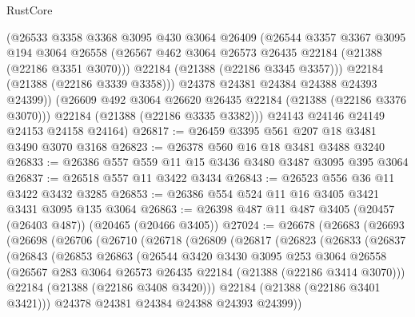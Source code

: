 \begin{lexlean}{RustCore}
\begin{coremodule}
            (@26533
              @3358
              @3368
              @3095
              @430
              @3064
              @26409
              (@26544
                @3357
                @3367
                @3095
                @194
                @3064
                @26558
                (@26567 @462 @3064 @26573 @26435 @22184 (@21388 (@22186 @3351 @3070)))
                @22184
                (@21388 (@22186 @3345 @3357)))
              @22184
              (@21388 (@22186 @3339 @3358)))
            @24378
            @24381
            @24384
            @24388
            @24393
            @24399))
        (@26609 @492 @3064 @26620 @26435 @22184 (@21388 (@22186 @3376 @3070)))
        @22184
        (@21388 (@22186 @3335 @3382)))
      @24143
      @24146
      @24149
      @24153
      @24158
      @24164)
@26817 := @26459 @3395 @561 @207 @18 @3481 @3490 @3070 @3168
@26823 := @26378 @560 @16 @18 @3481 @3488 @3240
@26833 := @26386 @557 @559 @11 @15 @3436 @3480 @3487 @3095 @395 @3064
@26837 := @26518 @557 @11 @3422 @3434
@26843 := @26523 @556 @36 @11 @3422 @3432 @3285
@26853 := @26386 @554 @524 @11 @16 @3405 @3421 @3431 @3095 @135 @3064
@26863 := @26398 @487 @11 @487 @3405 (@20457 (@26403 @487)) (@20465 (@20466 @3405))
@27024 := @26678
    (@26683
      (@26693
        (@26698
          (@26706
            (@26710
              (@26718
                (@26809
                  (@26817
                    (@26823
                      (@26833
                        (@26837
                          (@26843
                            (@26853
                              @26863
                              (@26544
                                @3420
                                @3430
                                @3095
                                @253
                                @3064
                                @26558
                                (@26567
                                  @283
                                  @3064
                                  @26573
                                  @26435
                                  @22184
                                  (@21388 (@22186 @3414 @3070)))
                                @22184
                                (@21388 (@22186 @3408 @3420)))
                              @22184
                              (@21388 (@22186 @3401 @3421)))
                            @24378
                            @24381
                            @24384
                            @24388
                            @24393
                            @24399))

\end{coremodule}
\end{lexlean}
